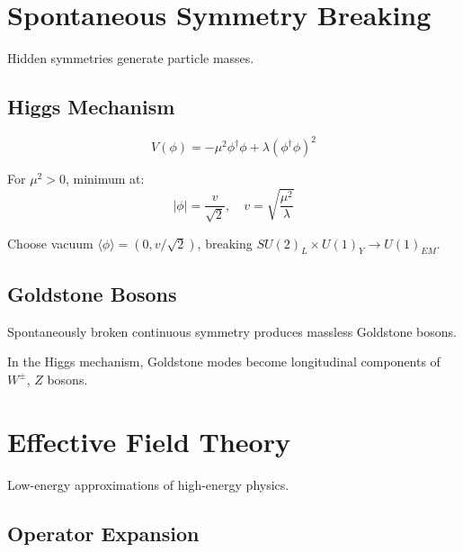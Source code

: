 \section{Spontaneous Symmetry Breaking}

Hidden symmetries generate particle masses.

\subsection{Higgs Mechanism}

\begin{definition}
\label{fa_21:def:higgs-pot}
\begin{equation}
V(\phi) = -\mu^2\phi^\dagger\phi + \lambda(\phi^\dagger\phi)^2
\end{equation}
\end{definition}

\begin{theorem}
\label{fa_21:thm:ssb}
For $\mu^2 > 0$, minimum at:
\begin{equation}
|\phi| = \frac{v}{\sqrt{2}}, \quad v = \sqrt{\frac{\mu^2}{\lambda}}
\end{equation}

Choose vacuum $\langle\phi\rangle = (0, v/\sqrt{2})$, breaking $SU(2)_L \times U(1)_Y \to U(1)_{EM}$.
\end{theorem}

\subsection{Goldstone Bosons}

\begin{proposition}
\label{fa_21:prop:goldstone}
Spontaneously broken continuous symmetry produces massless Goldstone bosons.
\end{proposition}

In the Higgs mechanism, Goldstone modes become longitudinal components of $W^\pm$, $Z$ bosons.

\section{Effective Field Theory}

Low-energy approximations of high-energy physics.

\subsection{Operator Expansion}

